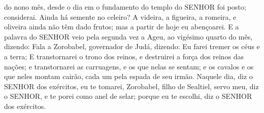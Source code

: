{{} do nono mês, desde o dia em o fundamento do templo do SENHOR foi posto; considerai.
Ainda há semente no celeiro? A videira, a figueira, a romeira, e oliveira ainda não têm dado frutos; mas a partir de hoje eu
{} abençoarei.
E a palavra do SENHOR veio pela segunda vez a Ageu, ao vigésimo quarto
{} do mês, dizendo:
Fala a Zorobabel, governador de Judá, dizendo: Eu farei tremer os céus e a terra;
E transtornarei o trono dos reinos, e destruirei a força dos reinos das nações; e transtornarei as carruagens, e os que nelas se sentam; e os cavalos e os que neles montam cairão, cada um pela espada de seu irmão.
Naquele dia, diz o SENHOR dos exércitos, eu te tomarei, Zorobabel, filho de Sealtiel, servo meu, diz o SENHOR, e te porei como anel de selar; porque eu te escolhi, diz o SENHOR dos exércitos.\par }

